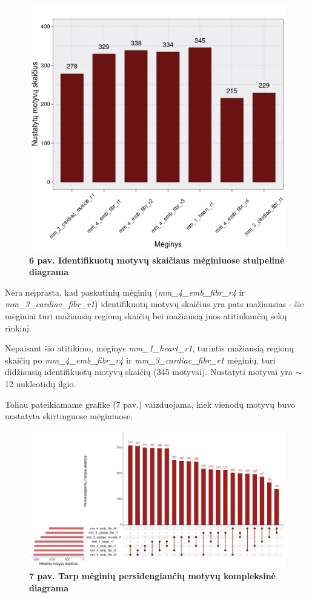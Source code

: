 \documentclass[12pt]{article}
\begin{document}
\begin{figure}[htb]
    \begin{center}
        \includegraphics[width=0.7\linewidth]{../Figures/motifs_in_samples.png}
        \caption*{\small\textbf{6 pav. Identifikuotų motyvų skaičiaus
                                mėginiuose stulpelinė diagrama}}
    \end{center}
\end{figure}

Nėra neįprasta, kad paskutinių mėginių (\small\emph{mm\_4\_emb\_fibr\_r4} ir
\small\emph{mm\_3\_cardiac\_fibr\_r1}) identifikuotų motyvų skaičius yra pats
mažiausias - šie mėginiai turi mažiausią regionų skaičių bei mažiausią juos
atitinkančių sekų rinkinį.

Nepaisant šio atitikimo, mėginys \small\emph{mm\_1\_heart\_r1}, turintis
mažiausią regionų skaičių po \small\emph{mm\_4\_emb\_fibr\_r4} ir
\small\emph{mm\_3\_cardiac\_fibr\_r1} mėginių, turi didžiausią identifikuotų
motyvų skaičių (345 motyvai). Nustatyti motyvai yra \(\sim\)12 nukleotidų ilgio.

Toliau pateikiamame grafike (7 pav.) vaizduojama, kiek vienodų motyvų buvo
nustatyta skirtinguose mėginiuose.

\newpage

\begin{figure}[htb]
    \begin{center}
        \includegraphics[width=1\linewidth]{../Figures/motif_intersections.png}
        \caption*{\small\textbf{7 pav. Tarp mėginių persidengiančių motyvų
                                kompleksinė diagrama}}
    \end{center}
\end{figure}
\end{document}

